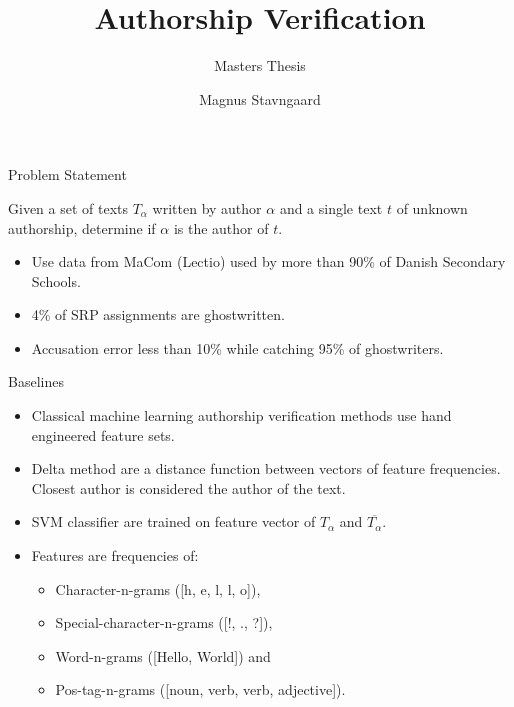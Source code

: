 \documentclass[10pt]{beamer}
\title{Authorship Verification}
\subtitle{Masters Thesis}
\date{}
\author{Magnus Stavngaard}
\institute{University of Copenhagen}
\begin{document}
\maketitle

\begin{frame}[fragile]{Problem Statement}
    \begin{definition}
        \label{def:authorship_verification}

        Given a set of texts $T_\alpha$ written by author $\alpha$ and a
        single text $t$ of unknown authorship, determine if $\alpha$ is
        the author of $t$.

    \end{definition}

    \begin{itemize}
        \item Use data from MaCom (Lectio) used by more than 90\% of Danish
            Secondary Schools.
        \item 4\% of SRP assignments are ghostwritten.
        \item Accusation error less than 10\% while catching 95\% of
            ghostwriters.
    \end{itemize}
\end{frame}

\begin{frame}[fragile]{Baselines}
    \begin{itemize}
        \item Classical machine learning authorship verification methods use
            hand engineered feature sets.
        \item Delta method are a distance function between vectors of feature
            frequencies. Closest author is considered the author of the text.
        \item SVM classifier are trained on feature vector of $T_\alpha$ and
            $\overline{T_\alpha}$.
        \item Features are frequencies of:
            \begin{itemize}
                \item Character-n-grams ([h, e, l, l, o]),
                \item Special-character-n-grams ([!, ., ?]),
                \item Word-n-grams ([Hello, World]) and
                \item Pos-tag-n-grams ([noun, verb, verb, adjective]).
            \end{itemize}
    \end{itemize}
\end{frame}
\end{document}
